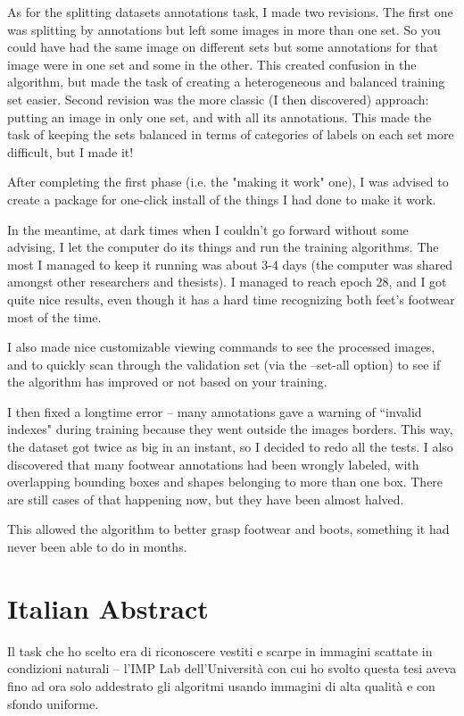 As for the splitting datasets annotations task, I made two revisions. The first one was splitting by annotations but left some images in more than one set. So you could have had the same image on different sets but some annotations for that image were in one set and some in the other. This created confusion in the algorithm, but made the task of creating a heterogeneous and balanced training set easier. Second revision was the more classic (I then discovered) approach: putting an image in only one set, and with all its annotations. This made the task of keeping the sets balanced in terms of categories of labels on each set more difficult, but I made it!

After completing the first phase (i.e. the "making it work" one), I was advised to create a package for one-click install of the things I had done to make it work.

In the meantime, at dark times when I couldn't go forward without some advising, I let the computer do its things and run the training algorithms. The most I managed to keep it running was about 3-4 days (the computer was shared amongst other researchers and thesists). I managed to reach epoch 28, and I got quite nice results, even though it has a hard time recognizing both feet's footwear most of the time. 

I also made nice customizable viewing commands to see the processed images, and to quickly scan through the validation set (via the --set-all option) to see if the algorithm has improved or not based on your training.

I then fixed a longtime error -- many annotations gave a warning of “invalid indexes" during training because they went outside the images borders. This way, the dataset got twice as big in an instant, so I decided to redo all the tests. I also discovered that many footwear annotations had been wrongly labeled, with overlapping bounding boxes and shapes belonging to more than one box. There are still cases of that happening now, but they have been almost halved.

This allowed the algorithm to better grasp footwear and boots, something it had never been able to do in months.
\pagebreak

\section*{Italian Abstract}


Il task che ho scelto era di riconoscere vestiti e scarpe in immagini scattate in condizioni naturali -- l'IMP Lab dell'Università con cui ho svolto questa tesi aveva fino ad ora solo addestrato gli algoritmi usando immagini di alta qualità e con sfondo uniforme.

